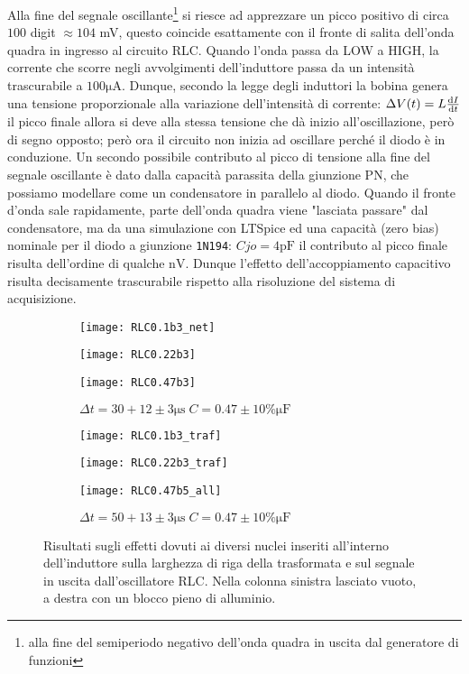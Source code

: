 \documentclass{article}[a4paper, oneside, 11pt]
\begin{document}
Alla fine del segnale oscillante\footnote{alla fine del
semiperiodo negativo dell'onda quadra in uscita dal generatore di funzioni}
si riesce ad apprezzare un picco positivo di circa $100$ digit $\approx 104$ mV,
questo coincide esattamente con il fronte di salita dell'onda quadra in
ingresso al circuito RLC.
Quando l'onda passa da LOW a HIGH, la corrente che scorre negli avvolgimenti
dell'induttore passa da un intensità trascurabile a $100 \si{\micro\A}$.
Dunque, secondo la legge degli induttori la bobina genera una tensione
proporzionale alla variazione dell'intensità di corrente:
$\Delta V(t) = L \frac{\mathrm{d} I}{\mathrm{d} t}$
il picco finale allora si deve alla stessa tensione che dà inizio
all'oscillazione, però di segno opposto; però ora il circuito non inizia
ad oscillare perché il diodo è in conduzione.
Un secondo possibile contributo al picco di tensione alla
fine del segnale oscillante è dato dalla capacità parassita
della giunzione PN, che possiamo  modellare come un condensatore
in parallelo al diodo. Quando il fronte d'onda sale rapidamente, parte
dell'onda quadra viene "lasciata passare" dal condensatore, ma da 
una simulazione con LTSpice ed una capacità (zero bias) nominale per
il diodo a giunzione \texttt{1N194}: $Cjo = 4 \si{\pico\farad}$
il contributo al picco finale risulta dell'ordine di qualche $\si{\nano\V}$.
Dunque l'effetto dell'accoppiamento capacitivo risulta decisamente trascurabile
rispetto alla risoluzione del sistema di acquisizione.
\begin{figure}[!htb]
\centering
	\begin{subfigure}{.5\textwidth}
		\texttt{[image: RLC0.1b3\_net]} 
	\caption{$\Delta t = 30 + 13 \pm 2 \si{\us} \; C = 0.1
			\pm 10 \% \si{\micro\F}$}
		\texttt{[image: RLC0.22b3]} 
	\caption{$\Delta t = 30 + 12 \pm 3 \si{\us} \; C = 0.22 
			\pm 10 \% \si{\micro\F}$}
		\texttt{[image: RLC0.47b3]} 
	\caption{$\Delta t = 30 + 12 \pm 3 \si{\us} \; C = 0.47
			\pm 10 \% \si{\micro\F}$}
	\end{subfigure}%
	\begin{subfigure}{.5\textwidth}
		\texttt{[image: RLC0.1b3\_traf]}
	\caption{$\Delta t = 30 + 12 \pm 3 \si{\us} \; C = 0.1
			\pm 10 \% \si{\micro\F}$}
		\texttt{[image: RLC0.22b3\_traf]}
	\caption{$\Delta t = 30 + 12 \pm 3 \si{\us} \; C = 0.22
			\pm 10\% \si{\micro\F}$}
		\texttt{[image: RLC0.47b5\_all]}
	\caption{$\Delta t = 50 + 13 \pm 3 \si{\us} \; C = 0.47
			\pm 10 \% \si{\micro\F}$}
	\end{subfigure}%
	\caption{Risultati sugli effetti dovuti ai diversi nuclei inseriti
			all'interno dell'induttore sulla larghezza di riga della trasformata
			e sul segnale in uscita dall'oscillatore RLC. Nella colonna sinistra
			lasciato vuoto, a destra con un blocco pieno di alluminio.
			 \label{fig: RLCall}}
\end{figure}
\end{document}
